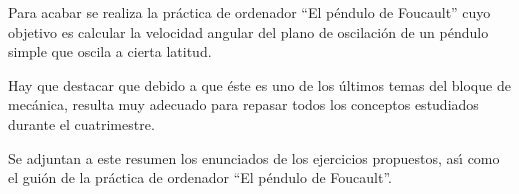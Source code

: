 \documentclass[a4paper,spanish,12pt]{article}
\begin{document}
Para acabar se realiza la pr\'{a}ctica de ordenador ``El p\'{e}ndulo de Foucault'' cuyo 
objetivo es calcular la velocidad angular del plano de oscilaci\'{o}n de un p\'{e}ndulo simple que
oscila a cierta latitud.

Hay que destacar que debido a que \'{e}ste  es uno de los \'{u}ltimos temas del bloque de mec\'{a}nica,
resulta muy adecuado para repasar todos los conceptos estudiados durante el 
cuatrimestre.

\vspace*{1cm}
Se adjuntan a este resumen los enunciados de los ejercicios propuestos, as\'{\i} como el gui\'{o}n de la
pr\'{a}ctica de ordenador ``El p\'{e}ndulo de Foucault''.
\end{document}
